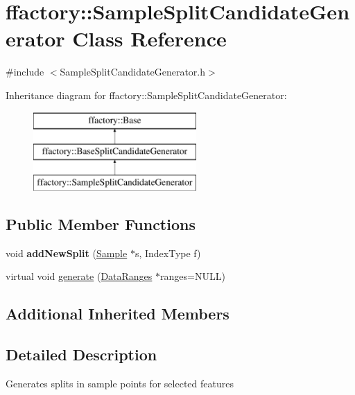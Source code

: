 \hypertarget{classffactory_1_1_sample_split_candidate_generator}{\section{ffactory\-:\-:Sample\-Split\-Candidate\-Generator Class Reference}
\label{classffactory_1_1_sample_split_candidate_generator}
}


{\ttfamily \#include $<$Sample\-Split\-Candidate\-Generator.\-h$>$}

Inheritance diagram for ffactory\-:\-:Sample\-Split\-Candidate\-Generator\-:\begin{figure}[H]
\begin{center}
\leavevmode
\includegraphics[height=3.000000cm]{classffactory_1_1_sample_split_candidate_generator}
\end{center}
\end{figure}
\subsection*{Public Member Functions}
\begin{DoxyCompactItemize}
\item 
\hypertarget{classffactory_1_1_sample_split_candidate_generator_a1fb3588de421a8a0074cb6f63f7e00ed}{void {\bfseries add\-New\-Split} (\hyperlink{classffactory_1_1_sample}{Sample} $\ast$s, Index\-Type f)}\label{classffactory_1_1_sample_split_candidate_generator_a1fb3588de421a8a0074cb6f63f7e00ed}

\item 
virtual void \hyperlink{classffactory_1_1_sample_split_candidate_generator_a7a589641d4668c711e002a440c00a6b8}{generate} (\hyperlink{classffactory_1_1_data_ranges}{Data\-Ranges} $\ast$ranges=N\-U\-L\-L)
\end{DoxyCompactItemize}
\subsection*{Additional Inherited Members}


\subsection{Detailed Description}
Generates splits in sample points for selected features 


